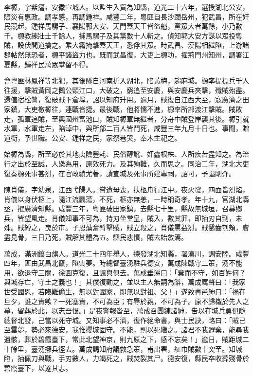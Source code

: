 \begin{pinyinscope}
李榞，字紫籓，安徽宣城人。以監生入貲為知縣，道光二十六年，選授湖北公安，賑災有惠政。調孝感，再調鍾祥。咸豐二年，粵匪自長沙躪岳州，犯武昌，所在奸民競起，鍾祥馬騾子、襄陽郭大安、天門蓋天王皆盜魁，黨眾大者萬餘，小乃數千。榞教練壯士千餘人，捕馬騾子及其黨數十人斬之。偵知郭大安方謀以眾投粵賊，設伏間道擒之。乘大霧掩擊蓋天王，悉俘其眾。時武昌、漢陽相繼陷，上游諸郡帖然無恐者，榞平諸盜力也。既而武昌復，大吏上榞功，擢荊門州知州，調署江夏縣，鍾祥民萬眾攀留不得。

會粵匪林鳳祥等北犯，其後隊自河南折入湖北，陷黃梅，趨麻城。榞率提標兵千人往援，擊賊黃岡之鵝公頸江口，大破之，窮追至安慶，與安慶兵夾擊，殲賊殆盡。還值宿松警，復破賊下倉埠，詔以知府升用。逾月，賊復自江西大至，寇廣濟之田家鎮，大吏檄榞往，連戰皆捷。最後戰，他將懦不進，榞率所部渡江擊賊。賊敗走，孤軍追賊，至興國州富池口，賊知榞軍無繼者，分舟中賊登岸襲其後。榞引就水軍，水軍走左，陷淖中，與所部二百人皆鬥死，咸豐三年九月十日也。事聞，贈道銜，予世職。公安、鍾祥之民，家祭巷哭，奉木主祀之。

始榞為縣，所至必於其地夷險豐耗、民俗醇訛、奸蠹根株、人所疾苦盡知之。為治行之出於至誠，人樂為用，原效死力。及其殉難，久而思之。同治二年，湖北大吏復奏榞死事甚烈，在官政績尤著，請宣城及死事所建專祠，詔可，予謚剛介。

陳肖儀，字幼泉，江西弋陽人。嘗遭母喪，扶柩舟行江中。夜火發，四面皆烈焰，肖儀以身伏柩上，隨江流飄蕩，不死，柩亦無恙，一時稱奇孝。年十九，官湖北縣丞，擢廣濟知縣。咸豐三年，粵匪破田家鎮，去縣七十里，縣故無城垣，召募鄉兵，皆望風走。肖儀知事不可為，持刃坐堂皇，賊入，數其罪，即抽刃自剄，未殊。賊縛之，曳於市。子恩藻奮臂擊賊，賊立殺之，肖儀罵益烈。賊鑿齒刳頰，膚盡見骨，三日乃死，賊解其體為五。縣民悲憤，賊去始斂焉。

萬成，滿洲鑲白旗人。道光二十四年舉人，揀發湖北知縣，署漢川，調安陸。咸豐四年，匪由武昌北竄，陷雲夢。時總督臺湧駐兵德安，萬成陳戰守二策，湧不能用，欲退守三關，徐圖克復，且諷與俱去。萬成垂涕曰：「棄而不守，如百姓何？與城存亡，守土之義也！」其僕復勸之，並以主人無嗣為辭，萬成厲聲曰：「我家世受國恩，若臨難偷生，無以對國家，即無以對祖、父！」遂致書邑紳曰：「禍在旦夕，誰之責歟？一死塞責，不可為臣；有辱於親，不可為子。原不歸櫬於先人之墓，留葬於此，以志吾恨。」是夜警報沓至，萬成召團練諸紳，告以在城兵勇俱隨總督北發，己當以死守城。又知事必不濟，復作絕命書，與士民訣，略曰：「賊已至雲夢，勢必來德安，我惟攖城固守。不能，則以死繼之。諸君不我遐棄，能尋我遺骸，葬於碧霞臺下，常此北望神京，則九原之下，感不忘矣！」逾日，賊距城二十餘里，臺湧擁兵徑去。萬成謁知府議救急策，甫出署，紅巾賊數十突至。知城陷，抽佩刀與戰，手刃數人，力竭死之，賊焚裂其尸。德安復，縣民卒收葬殘骨於碧霞臺下，以遂其志。


\end{pinyinscope}

